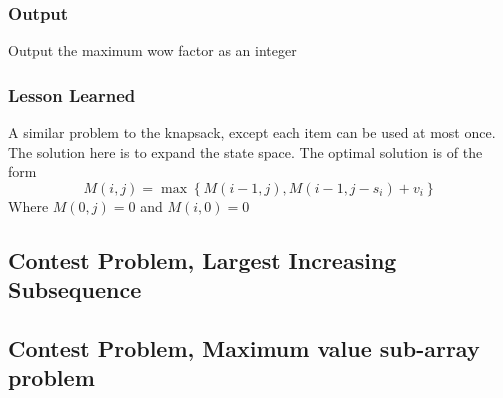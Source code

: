 \subsubsection{Output}
Output the maximum wow factor as an integer

\subsubsection{Lesson Learned}
A similar problem to the knapsack, except each item can be used at most once.  The solution here is to expand the state space.  The optimal solution is of the form
$$M(i,j) = \max \left\{ M(i-1, j) , M(i-1, j- s_i) + v_i \right\}$$
Where $M(0,j) = 0$ and $M(i,0) = 0$


\subsection{Contest Problem, Largest Increasing Subsequence}
\subsection{Contest Problem, Maximum value sub-array problem}

